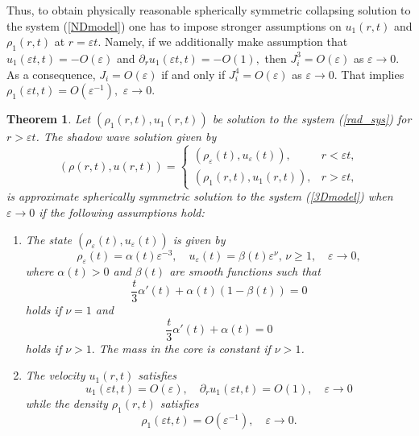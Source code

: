 \documentclass[reqno]{article}%
\theoremstyle{plain}
\newtheorem{theorem}{Theorem}[section]
\theoremstyle{definition}
\theoremstyle{remark}
\numberwithin{equation}{section}
\begin{document}
\medskip


Thus, to obtain physically reasonable spherically symmetric collapsing solution
 to the system (\ref{NDmodel}) one has to impose stronger assumptions on  $u_1(r,t)$ and $\rho_1(r,t)$ at $r=\varepsilon t$. Namely, if we additionally make assumption that 
$
u_1(\varepsilon t,t)=-O(\varepsilon) $ and $ \partial_r u_1(\varepsilon t,t)=-O(1),$
then $J_i^3=O(\varepsilon)$ as $\varepsilon\to 0$. As a consequence, $J_i= O(\varepsilon)$  if and only if $J_i^4=O(\varepsilon)$ as $\varepsilon\to 0$. That implies 
$
\rho_1(\varepsilon t,t)=O(\varepsilon^{-1}),
$ $\varepsilon\to 0.$
\begin{theorem}\label{thm:sdw}
Let $(\rho_1(r,t),u_1(r,t))$ be  solution to the system (\ref{rad_sys}) for $r>\varepsilon t$. The shadow wave solution given by 
\begin{equation}\label{sdw1}
(\rho(r,t),u(r,t))=
\begin{cases}
(\rho_\varepsilon(t), u_\varepsilon(t)), & r<\varepsilon t,\\
(\rho_1(r,t),u_1(r,t)), & r>\varepsilon t,
\end{cases}\end{equation}
is approximate spherically symmetric solution to the system (\ref{3Dmodel}) when $\varepsilon\to 0$ if the following assumptions hold:
\begin{enumerate}
\item The state $(\rho_\varepsilon(t),u_\varepsilon(t))$ is given by  
\begin{equation}\label{ass_vareps}
\rho_\varepsilon(t)=\alpha(t)\varepsilon^{-3},\quad u_\varepsilon(t)=\beta(t)\varepsilon^\nu,\,\nu\geq 1,\quad \varepsilon\to 0,
\end{equation}
where $\alpha(t)>0$ and  $\beta(t)$ are smooth functions such that
\[\frac{t}{3}\alpha'(t)+\alpha(t)(1-\beta(t))=0\]
holds if $\nu=1$ and 
\[\frac{t}{3}\alpha'(t)+\alpha(t)=0\] 
holds if $\nu>1.$  The mass in the core is constant if $\nu>1$.
\item The velocity $u_1(r,t)$ satisfies 
\begin{equation}\label{assum5}
u_1(\varepsilon t,t)=O(\varepsilon), \quad \partial_r u_1(\varepsilon t,t)=O(1),\quad \varepsilon\to 0\end{equation}
while the density $\rho_1(r,t)$ satisfies
\begin{equation}\label{assum6}
\rho_1(\varepsilon t,t)=O(\varepsilon^{-1}),\quad \varepsilon\to 0.
\end{equation}
\end{enumerate}
\end{theorem}
\end{document}
